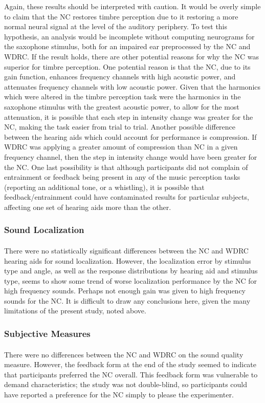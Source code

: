 Again, these results should be interpreted with caution.  It would be overly simple to claim that the NC restores timbre perception due to it restoring a more normal neural signal at the level of the auditory periphery.  To test this hypothesis, an analysis would be incomplete without computing neurograms for the saxophone stimulus, both for an impaired ear preprocessed by the NC and WDRC.  If the result holds, there are other potential reasons for why the NC was superior for timbre perception.  One potential reason is that the NC, due to its gain function, enhances frequency channels with high acoustic power, and attenuates frequency channels with low acoustic power.  Given that the harmonics which were altered in the timbre perception task were the harmonics in the saxophone stimulus with the greatest acoustic power, to allow for the most attenuation, it is possible that each step in intensity change was greater for the NC, making the task easier from trial to trial.  Another possible difference between the hearing aids which could account for performance is compression.  If WDRC was applying a greater amount of compression than NC in a given frequency channel, then the step in intensity change would have been greater for the NC.  One last possibility is that although participants did not complain of entrainment or feedback being present in any of the music perception tasks (reporting an additional tone, or a whistling), it is possible that feedback/entrainment could have contaminated results for particular subjects, affecting one set of hearing aids more than the other.

\subsubsection{Sound Localization}
\paragraph{}There were no statistically significant differences between the NC and WDRC hearing aids for sound localization.  However, the localization error by stimulus type and angle, as well as the response distributions by hearing aid and stimulus type, seems to show some trend of worse localization performance by the NC for high frequency sounds.  Perhaps not enough gain was given to high frequency sounds for the NC.  It is difficult to draw any conclusions here, given the many limitations of the present study, noted above.

\subsubsection{Subjective Measures}
\paragraph{}There were no differences between the NC and WDRC on the sound quality measure.  However, the feedback form at the end of the study seemed to indicate that participants preferred the NC overall.  This feedback form was vulnerable to demand characteristics; the study was not double-blind, so participants could have reported a preference for the NC simply to please the experimenter. 
